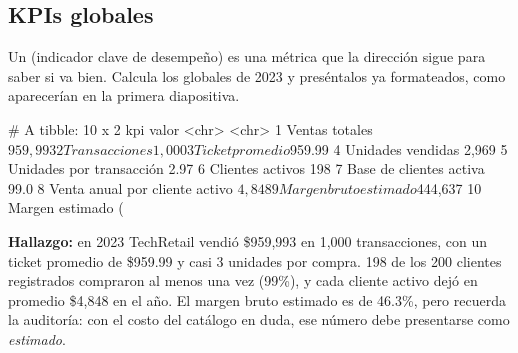 \subsection{KPIs globales}
\label{sec:m09-kpis-globales}

Un  (indicador clave de desempeño) es una métrica que la
dirección sigue para saber si va bien. Calcula los globales de 2023 y
preséntalos ya formateados, como aparecerían en la primera diapositiva.


\begin{rsalida}
# A tibble: 10 x 2
   kpi                            valor   
   <chr>                          <chr>   
 1 Ventas totales                 $959,993
 2 Transacciones                  1,000   
 3 Ticket promedio                $959.99 
 4 Unidades vendidas              2,969   
 5 Unidades por transacción       2.97    
 6 Clientes activos               198     
 7 Base de clientes activa        99.0%
 8 Venta anual por cliente activo $4,848  
 9 Margen bruto estimado          $444,637
10 Margen estimado (%
\end{rsalida}

\textbf{Hallazgo:} en 2023 TechRetail vendió \$959,993 en 1,000
transacciones, con un ticket promedio de \$959.99 y casi 3 unidades por
compra. 198 de los 200 clientes registrados compraron al menos una vez
(99\%), y cada cliente activo dejó en promedio \$4,848 en el año. El margen
bruto estimado es de 46.3\%, pero recuerda la auditoría: con el costo del
catálogo en duda, ese número debe presentarse como \emph{estimado}.

